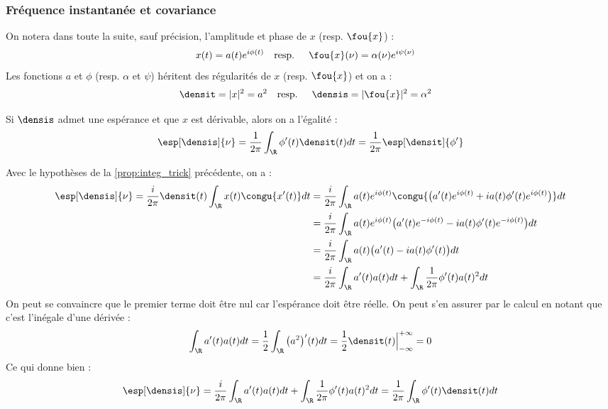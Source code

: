 \subsubsection{Fréquence instantanée et covariance}\label{subsec:freq_instant}

On notera dans toute la suite, sauf précision, l'amplitude et phase de $x$ (resp. $\fou{x}$) :
\begin{align*}
	x(t) &= a(t) e^{i\phi(t)}  &  \text{resp. }\quad \fou{x}(\nu) &= \alpha(\nu) e^{i\psi(\nu)}
\end{align*}
Les fonctions $a$ et $\phi$ (resp. $\alpha$ et $\psi$) héritent des régularités de $x$ (resp. $\fou{x}$) et on a :
\begin{align*}
	\densit &= |x|^2 = a^2  &  \text{resp. }\quad \densis &= |\fou{x}|^2 = \alpha^2
\end{align*}

\begin{proposition}\label{prop.esp_freq}
	Si $\densis$ admet une espérance et que $x$ est dérivable, alors on a l'égalité :
	\begin{equation}\label{eq:esp_freq}
		\esp[\densis]{\nu} = \frac{1}{2\pi}\int_\R \phi'(t)\densit(t)dt = \frac{1}{2\pi} \esp[\densit]{\phi'}
	\end{equation}
\end{proposition}

	
\begin{demo} 
	Avec le hypothèses de la \cref{prop:integ_trick} précédente, on a :
	\begin{align*}
		\esp[\densis]{\nu} = \frac{i}{2\pi} \densit(t) \int_\R x(t) \congu{x'(t)} dt &= \frac{i}{2\pi}\int_\R a(t)e^{i\phi(t)}\congu{\big( a'(t)e^{i\phi(t)}+ ia(t)\phi'(t)e^{i\phi(t)} \big)} dt \\
		&= \frac{i}{2\pi}\int_\R a(t)e^{i\phi(t)}\big( a'(t)e^{-i\phi(t)} -ia(t)\phi'(t)e^{-i\phi(t)} \big) dt \\
		&= \frac{i}{2\pi}\int_\R a(t)\big( a'(t)- ia(t)\phi'(t)\big) dt \\
		&= \frac{i}{2\pi}\int_\R a'(t)a(t) dt + \int_\R  \frac{1}{2\pi}\phi'(t)a(t)^2 dt \\
	\end{align*}
	On peut se convaincre que le premier terme doit être nul car l'espérance doit être réelle. On peut s'en assurer par le calcul en notant que c'est l’inégale d'une dérivée :
	\[\int_\R a'(t)a(t) dt = \frac{1}{2} \int_\R \big(a^2\big)'(t) dt = \frac{1}{2}\densit(t)\Big|_{-\infty}^{+\infty} = 0\]
	Ce qui donne bien :
	\[\esp[\densis]{\nu} = \frac{i}{2\pi}\int_\R a'(t)a(t) dt + \int_\R  \frac{1}{2\pi}\phi'(t)a(t)^2 dt = \frac{1}{2\pi}\int_\R \phi'(t)\densit(t) dt\]
\end{demo}



